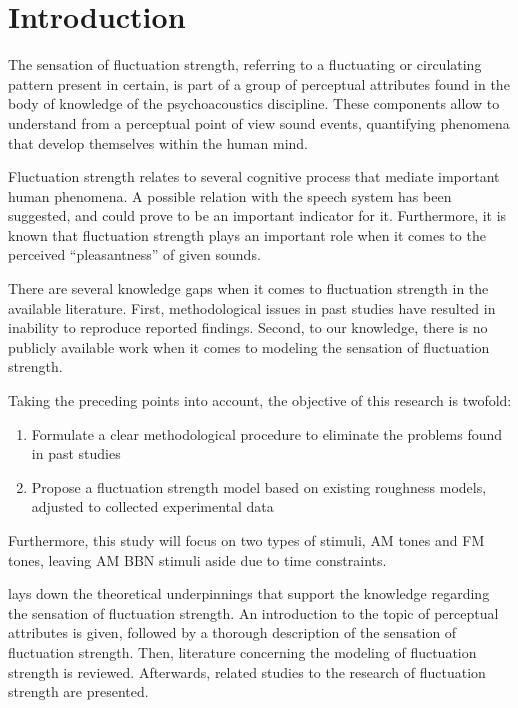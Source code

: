 \documentclass[../main.tex]{subfiles}
\begin{document}
\chapter{Introduction}
\label{cha:introduction}

The sensation of fluctuation strength, referring to a fluctuating or circulating
pattern present in certain, is part of a group of perceptual attributes found
in the body of knowledge of the psychoacoustics discipline. These components
allow to understand from a perceptual point of view sound events, quantifying
phenomena that develop themselves within the human mind.

Fluctuation strength relates to several cognitive process that mediate
important human phenomena. A possible relation with the speech system has been
suggested, and could prove to be an important indicator for it. Furthermore, it
is known that fluctuation strength plays an important role when it comes to the
perceived ``pleasantness'' of given sounds.

There are several knowledge gaps when it comes to fluctuation strength in the
available literature. First, methodological issues in past studies have resulted
in inability to reproduce reported findings. Second, to our knowledge, there is
no publicly available work when it comes to modeling the sensation of
fluctuation strength.

Taking the preceding points into account, the objective of this research is
twofold:
\begin{enumerate}
  \item Formulate a clear methodological procedure to eliminate the problems
    found in past studies
  \item Propose a fluctuation strength model based on existing roughness models,
    adjusted to collected experimental data
\end{enumerate}

Furthermore, this study will focus on two types of stimuli, \gls{AM} tones and
\gls{FM} tones, leaving \gls{AM} \gls{BBN} stimuli aside due to time
constraints.

 lays down the theoretical underpinnings that support the
knowledge regarding the sensation of fluctuation strength. An introduction to
the topic of perceptual attributes is given, followed by a thorough description
of the sensation of fluctuation strength. Then, literature concerning the
modeling of fluctuation strength is reviewed. Afterwards, related studies to
the research of fluctuation strength are presented.
\end{document}
